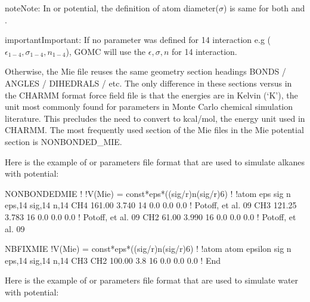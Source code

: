 \documentclass[letterpaper,10pt,english]{sphinxmanual}
\begin{document}
\begin{sphinxadmonition}{note}{Note:}
In  or  potential, the definition of atom diameter(\(\sigma\)) is same for both  and .
\end{sphinxadmonition}

\begin{sphinxadmonition}{important}{Important:}
If no parameter was defined for 1\sphinxhyphen{}4 interaction e.g (\(\epsilon_{1-4}, \sigma_{1-4}, n_{1-4}\)), GOMC will use the  \(\epsilon, \sigma, n\) for 1\sphinxhyphen{}4 interaction.
\end{sphinxadmonition}

Otherwise, the Mie file reuses the same geometry section headings \sphinxhyphen{} BONDS / ANGLES / DIHEDRALS / etc. The only difference in these sections versus in the CHARMM format force field file is that the energies are in Kelvin (‘K’),
the unit most commonly found for parameters in Monte Carlo chemical simulation literature. This precludes the need to convert to kcal/mol, the energy unit used in CHARMM.
The most frequently used section of the Mie files in the Mie potential section is NONBONDED\_MIE.

Here is the example of  or  parameters file format that are used to simulate alkanes with  potential:

\begin{sphinxVerbatim}[commandchars=\\\{\}]
NONBONDED\PYGZus{}MIE
!
!V(Mie) = const*eps*((sig/r)\PYGZca{}n\PYGZhy{}(sig/r)\PYGZca{}6)
!
!atom eps       sig     n     eps,1\PYGZhy{}4   sig,1\PYGZhy{}4   n,1\PYGZhy{}4
CH4   161.00    3.740   14    0.0       0.0       0.0 ! Potoff, et al. \PYGZsq{}09
CH3   121.25    3.783   16    0.0       0.0       0.0 ! Potoff, et al. \PYGZsq{}09
CH2    61.00    3.990   16    0.0       0.0       0.0 ! Potoff, et al. \PYGZsq{}09

NBFIX\PYGZus{}MIE
!V(Mie) = const*eps*((sig/r)\PYGZca{}n\PYGZhy{}(sig/r)\PYGZca{}6)
!
!atom atom  epsilon  sig     n     eps,1\PYGZhy{}4   sig,1\PYGZhy{}4   n,1\PYGZhy{}4
CH3   CH2   100.00   3.8     16    0.0       0.0       0.0 !
End
\end{sphinxVerbatim}

Here is the example of  or  parameters file format that are used to simulate water with  potential:
\end{document}
